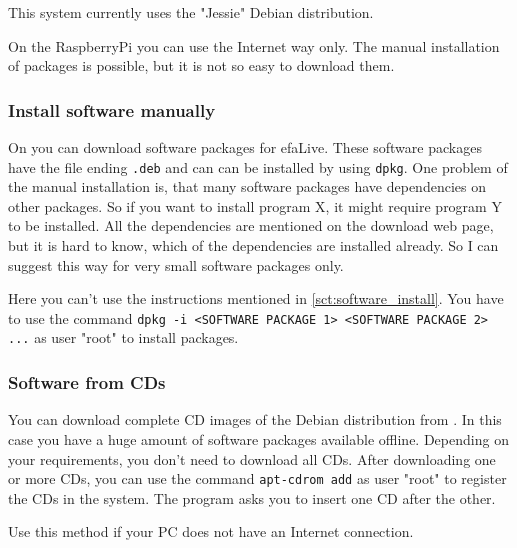 \documentclass[a4paper,12pt,twoside]{article}
\begin{document}
This system currently uses the "Jessie" Debian distribution.

On the RaspberryPi you can use the Internet way only. The manual installation
of packages is possible, but it is not so easy to download them.


\subsubsection{Install software manually}
\label{sct:software_manually}
On \cite{DEB3} you can download software packages for efaLive. These
software packages have the file ending
\texttt{.deb} and can can be installed by using
\texttt{dpkg}. One problem of the manual
installation is, that many software packages have dependencies on other
packages. So if you want to install program X, it might require program
Y to be installed. All the dependencies are mentioned on the download
web page, but it is hard to know, which of the dependencies are
installed already. So I can suggest this way for very small software
packages only.

Here you can't use the instructions mentioned in \ref{sct:software_install}.
You have to use the command \texttt{dpkg -i {\textless}SOFTWARE
PACKAGE 1{\textgreater} {\textless}SOFTWARE PACKAGE 2{\textgreater}
...} as user "root" to install packages.


\subsubsection{Software from CDs}
\label{sct:software_cd}
You can download complete CD images of the Debian distribution from
\cite{DEB4}. In this case you have a huge amount of software packages
available offline. Depending on your requirements, you
don't need to download all CDs. After downloading one
or more CDs, you can use the command \texttt{apt-cdrom
add} as user "root" to
register the CDs in the system. The program asks you to insert one CD
after the other.

Use this method if your PC does not have an Internet connection.
\end{document}

